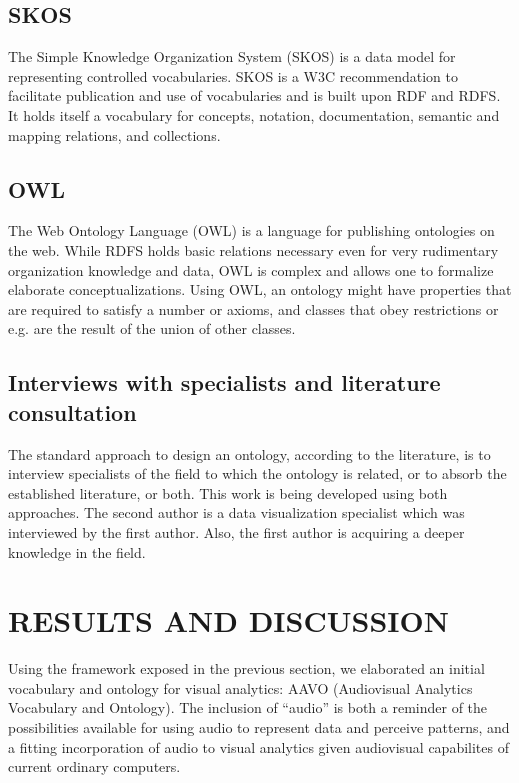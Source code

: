 \documentclass[12pt,fleqn]{article}
\begin{document}
\subsection{SKOS}
The Simple Knowledge Organization System (SKOS)
is a data model for representing controlled vocabularies.
SKOS is a W3C recommendation to facilitate publication
and use of vocabularies and is built upon RDF and RDFS.
It holds itself a vocabulary for concepts, notation, documentation,
semantic and mapping relations, and collections.

\subsection{OWL}
The Web Ontology Language (OWL) is a language for publishing ontologies on the web.
While RDFS holds basic relations necessary even for very rudimentary organization
knowledge and data, OWL is complex and allows one to formalize elaborate conceptualizations.
Using OWL, an ontology might have properties that are required to satisfy a number or axioms,
and classes that obey restrictions or e.g. are the result of the union of other classes.

\subsection{Interviews with specialists and literature consultation}
The standard approach to design an ontology, according to the literature,
is to interview specialists of the field to which the ontology is related,
or to absorb the established literature, or both.
This work is being developed using both approaches.
The second author is a data visualization specialist which was
interviewed by the first author.
Also, the first author is acquiring a deeper knowledge in the field.

\section{RESULTS AND DISCUSSION}\label{sec:res}
Using the framework exposed in the previous section,
we elaborated an initial vocabulary and ontology for
visual analytics: AAVO (Audiovisual Analytics Vocabulary and Ontology).
The inclusion of ``audio'' is both a reminder of the possibilities
available for using audio to represent data and perceive patterns,
and a fitting incorporation of audio to visual analytics given
audiovisual capabilites of current ordinary computers.
\end{document}
